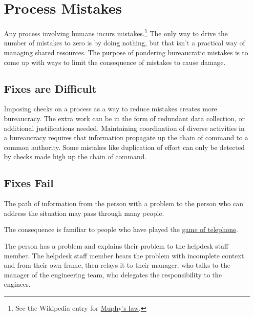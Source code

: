 \section{Process Mistakes\label{sec:process-mistakes}}

Any process involving humans incurs mistakes.\footnote{See the Wikipedia entry for \href{https://en.wikipedia.org/wiki/Murphy\%27s_law}{Muphy's law}.
} The only way to drive the number of mistakes to zero is by doing nothing, but that isn't a practical way of managing shared resources. 
The purpose of pondering bureaucratic mistakes is to come up with ways to limit the consequence of mistakes to cause damage. 

\subsection*{Fixes are Difficult}
Imposing checks on a process as a way to  reduce mistakes creates more bureaucracy. The extra work can be in the form of redundant data collection, or additional justifications needed. 
Maintaining coordination of diverse activities in a bureaucracy requires that information propagate up the chain of command to a common authority. Some mistakes like duplication of effort can only be detected by checks made high up the chain of command.


\subsection*{Fixes Fail}
The path of information from the person with a problem to the person who can address the situation may pass through many people. 

The consequence is familiar to people who have played the \href{https://en.wikipedia.org/wiki/Chinese_whispers\%23Game}{game of telephone}.
\begin{mdframed}[frametitle={Game of Telephone},frametitlerule=true,frametitlealignment=\centering]
The person has a problem and explains their problem to the helpdesk staff member. The helpdesk staff member hears the problem with incomplete context and from their own frame, then relays it to their manager, who talks to the manager of the engineering team, who delegates the responsibility to the engineer. 
\end{mdframed}

